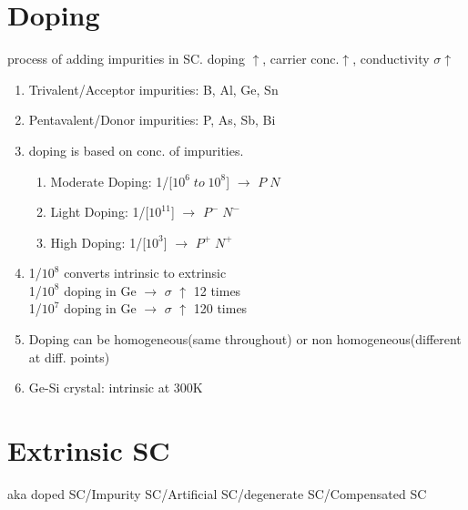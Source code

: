 \documentclass[10pt, a4paper]{report}
\begin{document}
	\section{Doping}
	process of adding impurities in SC. doping $\uparrow$, carrier conc.$\uparrow$, conductivity $\sigma$$\uparrow$
	\begin{enumerate}
		\item Trivalent/Acceptor impurities: B, Al, Ge, Sn
		\item Pentavalent/Donor impurities: P, As, Sb, Bi
		\item doping is based on conc. of impurities.
		\begin{enumerate}
			\item Moderate Doping: 1/[$ 10^6 \; to\; 10^8 $] $\rightarrow$ $ P\; N $
			\item Light Doping: 1/[$ 10^{11}$] $\rightarrow$ $ P^-\; N^- $
			\item High Doping: 1/[$ 10^3 $] $\rightarrow$ $ P^+\; N^+ $
		\end{enumerate}
		\item 1/$ 10^8 $ converts intrinsic to extrinsic \\
		1/$ 10^8 $ doping in Ge $\rightarrow$ $\sigma$ $\uparrow$ 12 times \\
		1/$ 10^7 $ doping in Ge $\rightarrow$ $\sigma$ $\uparrow$ 120 times
		\item Doping can be homogeneous(same throughout) or non homogeneous(different at diff. points)
		\item Ge-Si crystal: intrinsic at 300K
	\end{enumerate}
	\section{Extrinsic SC}
	aka doped SC/Impurity SC/Artificial SC/degenerate SC/Compensated SC \\
\end{document}
